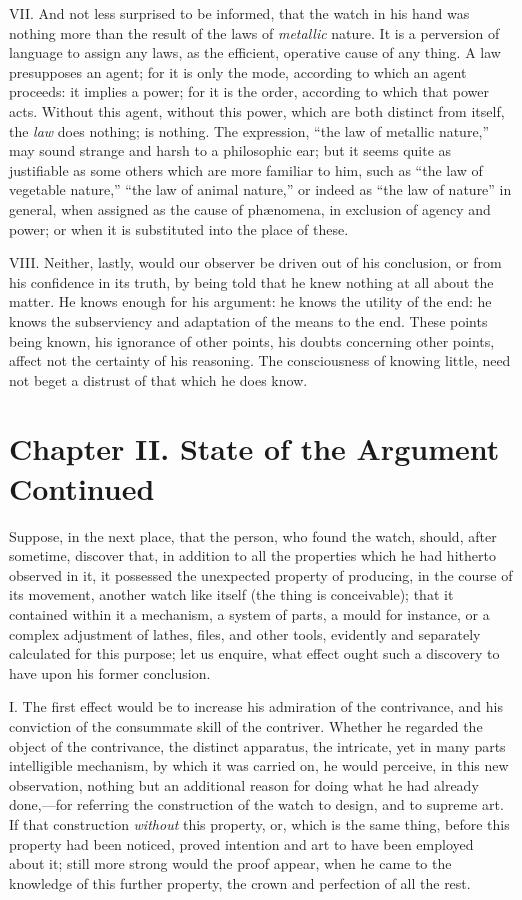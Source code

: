 VII. And not less surprised to be informed, that the watch in his hand
was nothing more than the result of the laws of \textit{metallic}
nature. It is a perversion of language to assign any laws, as the
efficient, operative cause of any thing. A law presupposes an agent;
for it is only the mode, according to which an agent proceeds: it
implies a power; for it is the order, according to which that power
acts. Without this agent, without this power, which are both distinct
from itself, the \textit{law} does nothing; is nothing. The
expression, ``the law of metallic nature,'' may sound strange and
harsh to a philosophic ear; but it seems quite as justifiable as some
others which are more familiar to him, such as ``the law of vegetable
nature,'' ``the law of animal nature,'' or indeed as ``the law of
nature'' in general, when assigned as the cause of ph{\ae}nomena, in
exclusion of agency and power; or when it is substituted into the
place of these.

VIII. Neither, lastly, would our observer be driven out of his
conclusion, or from his confidence in its truth, by being told that he
knew nothing at all about the matter. He  knows enough for his
argument: he knows the utility of the end: he knows the subserviency
and adaptation of the means to the end. These points being known, his
ignorance of other points, his doubts concerning other points,
affect not the certainty of his reasoning. The consciousness of
knowing little, need not beget a distrust of that which he does
know.

\section*{Chapter II. State of the Argument Continued}

Suppose, in the next place, that the person, who found the watch,
should, after sometime, discover that, in addition to all the
properties which he had hitherto observed in it, it possessed the
unexpected property of producing, in the course of its movement,
another watch like itself (the thing is conceivable); that it
contained within it a mechanism, a system of parts, a mould for
instance, or a complex adjustment of lathes, files, and other tools,
evidently and separately calculated for this purpose; let us
enquire, what effect ought such a discovery to have upon his former
conclusion.

I. The first effect would be to increase his admiration of the
contrivance, and his conviction of the consummate skill of the
contriver. Whether he regarded the object of the contrivance, the
distinct apparatus, the intricate, yet in many parts intelligible
mechanism, by which it was carried on, he would perceive, in this new
observation, nothing but an additional reason for doing what he had
already done,---for referring the construction of the watch to design,
and to supreme art. If that construction \textit{without} this
property, or, which is the same thing, before this property had been
noticed, proved intention and art to have been employed about it;
still more strong would the proof appear, when he came to the
knowledge of this further property, the crown and perfection of all
the rest.


